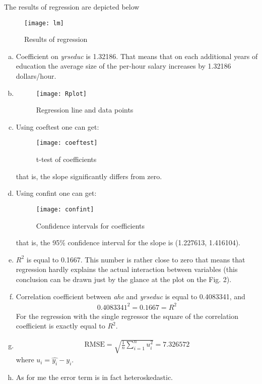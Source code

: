 \documentclass[a4paper]{article}
\begin{document}
The results of regression are depicted below
\begin{figure}[h]
	\centering
	\texttt{[image: lm]}
	\caption{Results of regression}
\end{figure}
\begin{enumerate}[a.]
	\item Coefficient on \textit{yrseduc} is 1.32186. That means that on each additional years of education the average size of the per-hour salary increases by 1.32186 dollars/hour.
	\item \begin{figure}[h]
		\centering
		\texttt{[image: Rplot]}
		\caption{Regression line and data points}
	\end{figure}
\newpage
\item Using coeftest one can get:
 \begin{figure}[h]
	\centering
	\texttt{[image: coeftest]}
	\caption{t-test of coefficients}
\end{figure}



that is, the slope significantly differs from zero.
\item Using confint one can get:
\begin{figure}[h]
	\centering
	\texttt{[image: confint]}
	\caption{Confidence intervals for coefficients}
\end{figure}




that is, the 95\% confidence interval for the slope is (1.227613, 1.416104).
\item $R^2$ is equal to 0.1667. This number is rather close to zero that means that regression hardly explains the actual interaction between variables (this conclusion can be drawn just by the glance at the plot on the Fig. 2).
\item Correlation coefficient between \textit{ahe} and \textit{yrseduc} is equal to 0.4083341, and 
\begin{align*}
0.4083341^2 = 0.1667 = R^2
\end{align*}
For the regression with the single regressor the square of the correlation coefficient is exactly equal to $R^2$.
\item 
\begin{align*}
\text{RMSE} = \sqrt{\frac{1}{n}\sum_{i=1}^n u_i^2} = 7.326572
\end{align*}
where $u_i = \hat{y_i} - y_i$.
\item As for me the error term is in fact heteroskedastic.
\end{enumerate}
\end{document}
